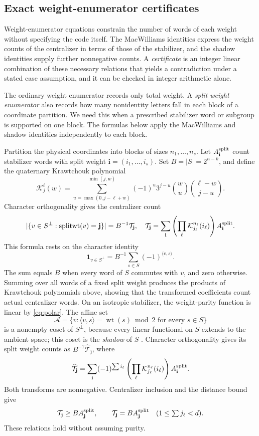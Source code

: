 \documentclass[11pt]{article}
\theoremstyle{definition}
\theoremstyle{remark}
\newcommand{\wt}{\operatorname{wt}}
\begin{document}
\subsection{Exact weight-enumerator certificates}\label{sec:certificates}

Weight-enumerator equations constrain the number of words of each weight
without specifying the code itself. The MacWilliams identities
\cite{shorlaflamme,rains98} express the weight counts of the centralizer
in terms of those of the stabilizer, and the shadow identities
\cite{rains} supply further nonnegative counts. A \emph{certificate} is
an integer linear combination of these necessary relations that yields a
contradiction under a stated case assumption, and it can be checked in
integer arithmetic alone.

The ordinary weight enumerator records only total weight. A \emph{split
weight enumerator} \cite{macwilliams,laiashikhmin} also records how many
nonidentity letters fall in each block of a coordinate partition. We
need this when a prescribed stabilizer word or subgroup is supported on
one block. The formulas below apply the MacWilliams and shadow
identities independently to each block.

Partition the physical coordinates into blocks of sizes
\(n_1,\ldots,n_s\). Let \(A^{\rm split}_{\mathbf i}\) count stabilizer
words with split weight \(\mathbf i=(i_1,\ldots,i_s)\). Set
\(B=|S|=2^{n-k}\), and define the quaternary Krawtchouk polynomial
\[
 \mathcal{K}_j^{\ell}(w)=\sum_{u=\max(0,j-\ell+w)}^{\min(j,w)}
          (-1)^u3^{j-u}\binom wu\binom{\ell-w}{j-u}.
\]
Character orthogonality gives the centralizer count
\[
 |\{v\in S^\perp:\operatorname{splitwt}(v)=\mathbf j\}|
 =B^{-1}\mathcal T_{\mathbf j},\quad
 \mathcal T_{\mathbf j}=\sum_{\mathbf i}
       \left(\prod_\ell \mathcal{K}_{j_\ell}^{n_\ell}(i_\ell)\right)A^{\rm split}_{\mathbf i}.
\]
This formula rests on the character identity
\[
 \mathbf 1_{v\in S^\perp}=B^{-1}\sum_{s\in S}(-1)^{\langle v,s\rangle}.
\]
The sum equals \(B\) when every word of \(S\) commutes with \(v\), and
zero otherwise. Summing over all words of a fixed split weight produces
the products of Krawtchouk polynomials above, showing that the
transformed coefficients count actual centralizer words.
On an isotropic stabilizer, the weight-parity function is linear by
\eqref{eq:polar}. The affine set
\[
 \mathcal A=\{v:\langle v,s\rangle=\wt(s)\bmod2
                          \text{ for every }s\in S\}
\]
is a nonempty coset of \(S^\perp\), because every linear functional on
\(S\) extends to the ambient space; this coset is the \emph{shadow} of
\(S\) \cite{rains}. Character orthogonality gives its split weight
counts as \(B^{-1}\widehat{\mathcal T}_{\mathbf j}\), where
\[
 \widehat{\mathcal T}_{\mathbf j}=\sum_{\mathbf i}(-1)^{\sum i_\ell}
       \left(\prod_\ell \mathcal{K}_{j_\ell}^{n_\ell}(i_\ell)\right)A^{\rm split}_{\mathbf i}.
\]
Both transforms are nonnegative. Centralizer inclusion and the distance
bound give
\[
 \mathcal T_{\mathbf j}\geq BA^{\rm split}_{\mathbf j},\qquad
 \mathcal T_{\mathbf j}=BA^{\rm split}_{\mathbf j}\quad(1\leq\textstyle\sum j_\ell<d).
\]
These relations hold without assuming purity.
\end{document}
